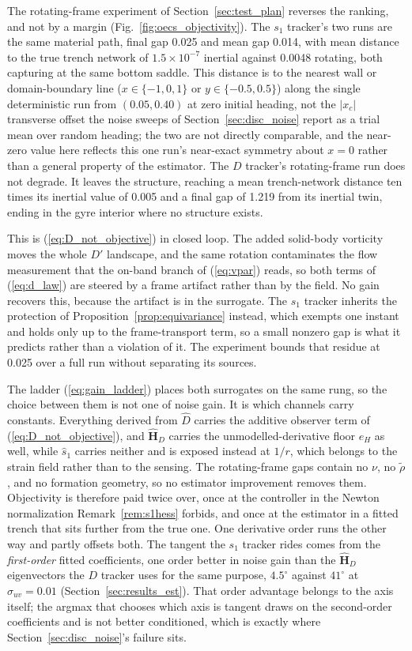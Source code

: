 \documentclass[lettersize,journal]{IEEEtran}
\begin{document}
The rotating-frame experiment of Section~\ref{sec:test_plan} reverses the
ranking, and not by a margin (Fig.~\ref{fig:oecs_objectivity}). The $s_1$
tracker's two runs are the same material path, final gap 0.025 and mean gap
0.014, with mean distance to the true trench network of $1.5\times 10^{-7}$
inertial against 0.0048 rotating, both capturing at the same bottom saddle.
This distance is to the nearest wall or domain-boundary line ($x \in
\{-1,0,1\}$ or $y \in \{-0.5,0.5\}$) along the single deterministic run
from $(0.05, 0.40)$ at zero initial heading, not the $|x_c|$ transverse
offset the noise sweeps of Section~\ref{sec:disc_noise} report as a
trial mean over random heading; the two are not directly comparable, and
the near-zero value here reflects this one run's near-exact symmetry
about $x=0$ rather than a general property of the estimator. The $D$
tracker's rotating-frame run does not degrade. It leaves the structure,
reaching a mean trench-network distance ten times its inertial value of
0.005 and a final gap of 1.219 from its inertial twin, ending in the gyre
interior where no structure exists.

This is (\ref{eq:D_not_objective}) in closed loop. The added solid-body
vorticity moves the whole $D'$ landscape, and the same rotation
contaminates the flow measurement that the on-band branch of
(\ref{eq:vpar}) reads, so both terms of (\ref{eq:d_law}) are steered by a
frame artifact rather than by the field. No gain recovers this, because the
artifact is in the surrogate. The $s_1$ tracker inherits the protection of
Proposition~\ref{prop:equivariance} instead, which exempts one instant and
holds only up to the frame-transport term, so a small nonzero gap is what
it predicts rather than a violation of it. The experiment bounds that
residue at 0.025 over a full run without separating its sources.

The ladder (\ref{eq:gain_ladder}) places both surrogates on the same rung,
so the choice between them is not one of noise gain. It is which channels
carry constants. Everything derived from $\hat{D}$ carries the additive
observer term of (\ref{eq:D_not_objective}), and $\hat{\mathbf{H}}_D$
carries the unmodelled-derivative floor $e_H$ as well, while $\hat{s}_1$
carries neither and is exposed instead at $1/r$, which belongs to the
strain field rather than to the sensing. The rotating-frame gaps contain
no $\nu$, no $\tilde{\rho}$, and no formation geometry, so no estimator
improvement removes them. Objectivity is therefore paid twice over, once
at the controller in the Newton normalization
Remark~\ref{rem:s1hess} forbids, and once at the estimator in a fitted
trench that sits further from the true one. One derivative order runs the
other way and partly offsets both. The tangent the $s_1$ tracker rides
comes from the
\emph{first-order} fitted coefficients, one order better in noise gain than
the $\hat{\mathbf{H}}_D$ eigenvectors the $D$ tracker uses for the same
purpose, $4.5^\circ$ against $41^\circ$ at $\sigma_{uv} = 0.01$
(Section~\ref{sec:results_est}). That order advantage belongs to the axis
itself; the argmax that chooses which axis is tangent draws on the
second-order coefficients and is not better conditioned, which is exactly
where Section~\ref{sec:disc_noise}'s failure sits.
\end{document}
